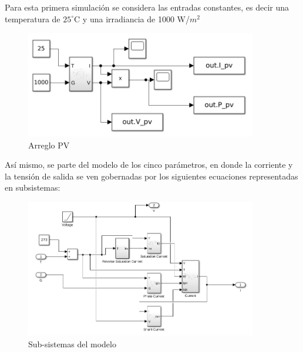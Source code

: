 \documentclass[a4paper,12pt]{article}
\begin{document}
	Para esta primera simulación se considera las entradas constantes, es decir una temperatura de $25^{\circ}$C y una irradiancia de 1000 W/$m^2$
	\begin{figure}[htb]
		\centering
		\includegraphics[width=0.9\textwidth]{./imagenes/simulink1.png}
		\caption{Arreglo PV}
	\end{figure} 
	
	Así mismo, se parte del modelo de los cinco parámetros, en donde la corriente y la tensión de salida se ven gobernadas por los siguientes ecuaciones representadas en subsistemas: 

	\begin{figure}[htb]
		\centering
		\includegraphics[width=0.9\textwidth]{./imagenes/simulink2.png}
		\caption{Sub-sistemas del modelo}
	\end{figure} 
	
	\newpage
	
	
	
\end{document}
